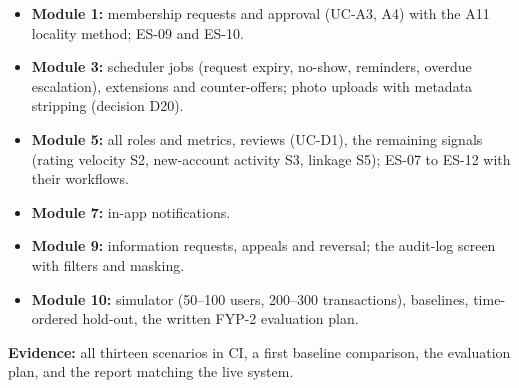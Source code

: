 \begin{itemize}
\item \textbf{Module 1:} membership requests and approval (UC-A3, A4) with the A11 locality method; ES-09 and ES-10.
\item \textbf{Module 3:} scheduler jobs (request expiry, no-show, reminders, overdue escalation), extensions and counter-offers; photo uploads with metadata stripping (decision D20).
\item \textbf{Module 5:} all roles and metrics, reviews (UC-D1), the remaining signals (rating velocity S2, new-account activity S3, linkage S5); ES-07 to ES-12 with their workflows.
\item \textbf{Module 7:} in-app notifications.
\item \textbf{Module 9:} information requests, appeals and reversal; the audit-log screen with filters and masking.
\item \textbf{Module 10:} simulator (50--100 users, 200--300 transactions), baselines, time-ordered hold-out, the written FYP-2 evaluation plan.
\end{itemize}

\textbf{Evidence:} all thirteen scenarios in CI, a first baseline comparison, the evaluation plan, and the report matching the live system.

